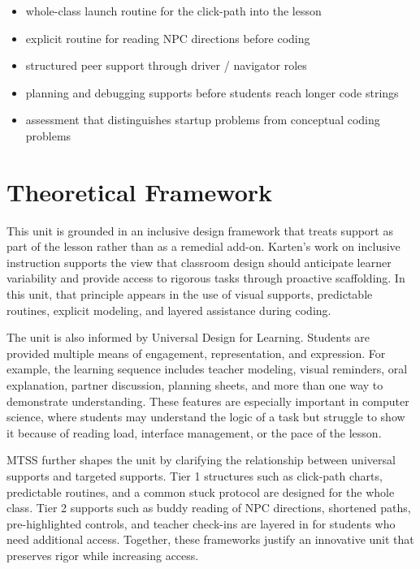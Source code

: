 \documentclass[12pt]{article}
\begin{document}
\begin{keybox}
\begin{itemize}
\item whole-class launch routine for the click-path into the lesson
\item explicit routine for reading NPC directions before coding
\item structured peer support through driver / navigator roles
\item planning and debugging supports before students reach longer code strings
\item assessment that distinguishes startup problems from conceptual coding problems
\end{itemize}
\end{keybox}

\section{Theoretical Framework}

This unit is grounded in an inclusive design framework that treats support as part of the lesson rather than as a remedial add-on. Karten's work on inclusive instruction supports the view that classroom design should anticipate learner variability and provide access to rigorous tasks through proactive scaffolding. In this unit, that principle appears in the use of visual supports, predictable routines, explicit modeling, and layered assistance during coding.

The unit is also informed by Universal Design for Learning. Students are provided multiple means of engagement, representation, and expression. For example, the learning sequence includes teacher modeling, visual reminders, oral explanation, partner discussion, planning sheets, and more than one way to demonstrate understanding. These features are especially important in computer science, where students may understand the logic of a task but struggle to show it because of reading load, interface management, or the pace of the lesson.

MTSS further shapes the unit by clarifying the relationship between universal supports and targeted supports. Tier 1 structures such as click-path charts, predictable routines, and a common stuck protocol are designed for the whole class. Tier 2 supports such as buddy reading of NPC directions, shortened paths, pre-highlighted controls, and teacher check-ins are layered in for students who need additional access. Together, these frameworks justify an innovative unit that preserves rigor while increasing access.
\end{document}
